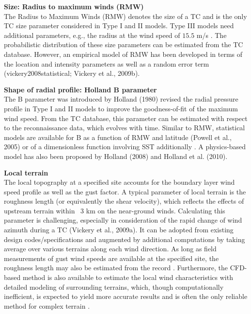 \noindent\textbf{Size: Radius to maximum winds (RMW)} \\The Radius to Maximum Winds (RMW) denotes the size of a TC and is the only TC size parameter considered in Type I and II models. Type III models need additional parameters, e.g., the radius at the wind speed of $15.5$ m/s \citep{chavas2016model}. The probabilistic distribution of these size parameters can be estimated from the TC database. However, an empirical model of RMW has been developed in terms of the location and intensity parameters as well as a random error term (vickery2008statistical; Vickery et al., 2009b).
\newline

\noindent\textbf{Shape of radial profile: Holland B parameter} \\The B parameter was introduced by Holland (1980) revised the radial pressure profile in Type I and II models to improve the goodness-of-fit of the maximum wind speed. From the TC database, this parameter can be estimated with respect to the reconnaissance data, which evolves with time. Similar to RMW, statistical models are available for B as a function of RMW and latitude (Powell et al., 2005) or of a dimensionless function involving SST additionally \citep{vickery2008statistical}. A physics-based model has also been proposed by Holland (2008) and Holland et al. (2010).
\newline

\noindent\textbf{Local terrain} \\The local topography at a specified site accounts for the boundary layer wind speed profile as well as the gust factor. A typical parameter of local terrain is the roughness length (or equivalently the shear velocity), which reflects the effects of upstream terrain within ~3 km on the near-ground winds. Calculating this parameter is challenging, especially in consideration of the rapid change of wind azimuth during a TC (Vickery et al., 2009a). It can be adopted from existing design codes/specifications and augmented by additional computations by taking average over various terrains along each wind direction. As long as field measurements of gust wind speeds are available at the specified site, the roughness length may also be estimated from the record \citep{masters2010objective}. Furthermore, the CFD-based method is also available to estimate the local wind characteristics with detailed modeling of surrounding terrains, which, though computationally inefficient, is expected to yield more accurate results and is often the only reliable method for complex terrain \citep{huang2013prediction,ishihara2005wind}. 
\newline

